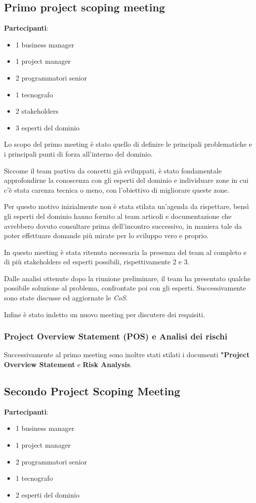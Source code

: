 \subsection{Primo project scoping meeting}
\textbf{Partecipanti}:
\begin{itemize}
    \item 1 business manager
    \item 1 project manager
    \item 2 programmatori senior
    \item 1 tecnografo
    \item 2 stakeholders
    \item 3 esperti del dominio
\end{itemize}
Lo scopo del primo meeting è stato quello di definire le principali problematiche e i principali punti di forza all'interno del dominio.

Siccome il team partiva da concetti già sviluppati, è stato fondamentale approfondirne la conoscenza con gli esperti del dominio e
individuare zone in cui c'è stata carenza tecnica o meno, con l'obiettivo di migliorare queste zone.

Per questo motivo inizialmente non è stata stilata un'agenda da rispettare, bensì gli esperti del dominio hanno fornito al team articoli e documentazione
che avrebbero dovuto consultare prima dell'incontro successivo, in maniera tale da poter effettuare domande più mirate per lo sviluppo vero e proprio.

In questo meeting è stata ritenuta necessaria la presenza del team al completo e di più stakeholders ed esperti possibili, rispettivamente 2 e 3.

Dalle analisi ottenute dopo la riunione preliminare, il team ha presentato qualche possibile soluzione al problema, confrontate poi con gli esperti.
Successivamente sono state discusse ed aggiornate le \textit{CoS}.

Infine è stato indetto un nuovo meeting per discutere dei requisiti.

\subsubsection{Project Overview Statement (POS) e Analisi dei rischi}
Successivamente al primo meeting sono inoltre stati stilati i documenti \textbf{"Project Overview Statement} e \textbf{Risk Analysis}.

\subsection{Secondo Project Scoping Meeting}
\textbf{Partecipanti}:
\begin{itemize}
    \item 1 business manager
    \item 1 project manager
    \item 2 programmatori senior
    \item 1 tecnografo
    \item 2 esperti del dominio
\end{itemize}


